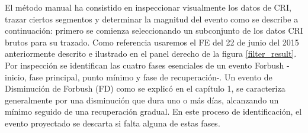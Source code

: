 El método manual ha consistido en inspeccionar visualmente los datos de CRI, trazar ciertos segmentos y determinar la magnitud del evento como se describe a continuación: primero se comienza seleccionando un subconjunto de los datos CRI brutos para su trazado. Como referencia usaremos el FE del 22 de junio del 2015 anteriormente descrito e ilustrado en el panel derecho de la figura \ref{filter_result}. Por inspección se identifican las cuatro fases esenciales de un evento Forbush -inicio, fase principal, punto mínimo y fase de recuperación-. Un evento de Disminución de Forbush (FD) como se explicó en el capítulo 1, se caracteriza generalmente por una disminución que dura uno o más días, alcanzando un mínimo seguido de una recuperación gradual. En este proceso de identificación, el evento proyectado se descarta si falta alguna de estas fases. 

